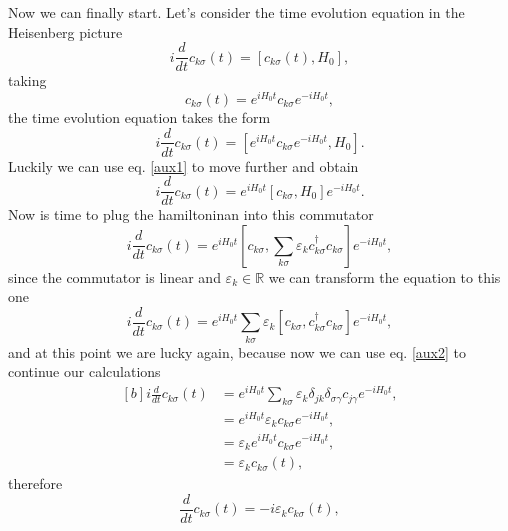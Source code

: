 \begin{questions}
\begin{solution}
  Now we can finally start. Let's consider the time evolution equation in the Heisenberg picture
  \begin{equation}
    i\frac{d}{dt} c_{k\sigma}(t) = [c_{k\sigma}(t), H_0],
  \end{equation}
  taking
  \begin{equation}
    c_{k\sigma}(t) = e^{iH_0 t} c_{k\sigma} e^{- iH_0 t},
  \end{equation}
  the time evolution equation takes the form
  \begin{equation}
    i\frac{d}{dt} c_{k\sigma}(t) = [e^{iH_0 t} c_{k\sigma} e^{- iH_0 t}, H_0].
  \end{equation}
  Luckily we can use eq. \ref{aux1} to move further and obtain
  \begin{equation}
    i\frac{d}{dt} c_{k\sigma}(t) =  e^{iH_0 t}[ c_{k\sigma} , H_0]e^{- iH_0 t}.
  \end{equation}
  Now is time to plug the hamiltoninan into this commutator
  \begin{equation}
    i\frac{d}{dt} c_{k\sigma}(t) =  e^{iH_0 t}[ c_{k\sigma} , \sum_{k\sigma} \varepsilon_k c_{k\sigma}^\dagger c_{k\sigma}]e^{- iH_0 t},
  \end{equation}
  since the commutator is linear and $\varepsilon_k\in\mathbb{R}$ we can transform the equation to this one
  \begin{equation}
    i\frac{d}{dt} c_{k\sigma}(t) =  e^{iH_0 t}\sum_{k\sigma} \varepsilon_k[ c_{k\sigma} ,  c_{k\sigma}^\dagger c_{k\sigma}]e^{- iH_0 t},
  \end{equation}
  and at this point we are lucky again, because now we can use eq. \ref{aux2} to continue our calculations
  \begin{equation}
    \begin{aligned}[b]
      i\frac{d}{dt} c_{k\sigma}(t) &=  e^{iH_0 t}\sum_{k\sigma} \varepsilon_k \delta_{jk}\delta_{\sigma \gamma} c_{j\gamma}e^{- iH_0 t},\\
      &=  e^{iH_0 t} \varepsilon_k  c_{k\sigma}e^{- iH_0 t},\\
      &=  \varepsilon_k e^{iH_0 t}  c_{k\sigma}e^{- iH_0 t}, \\
      &=  \varepsilon_k c_{k\sigma}(t),
    \end{aligned}
  \end{equation}
  therefore
  \begin{equation}
    \frac{d}{dt} c_{k\sigma}(t) = -i \varepsilon_k c_{k\sigma}(t),
    \label{dif}
  \end{equation}

\end{solution}
\end{questions}
